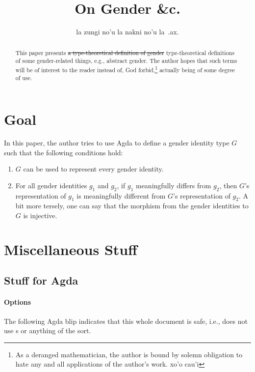 \documentclass{article}
\title{On Gender \&c.}
\author{la zungi no'u la nakni no'u la\ .ax.}
\theoremstyle{remark}
\begin{document}
\maketitle{}

\begin{abstract}
\sloppypar{}
This paper presents \st{a type-theoretical definition of gender} type-theoretical definitions of some gender-related things, e.g., abstract gender.  The author hopes that such terms will be of interest to the reader instead of, God forbid,\footnote{As a deranged mathematician, the author is bound by solemn obligation to hate any and all applications of the author's work.  xo'o cau'i} actually being of some degree of use.
\end{abstract}

\section{Goal}
In this paper, the author tries to use Agda to define a gender identity type \(G\) such that the following conditions hold:

\begin{enumerate}
  \item \(G\) can be used to represent every gender identity.
  \item For all gender identities \(g_1\) and \(g_2\), if \(g_1\) meaningfully differs from \(g_2\), then \(G\)'s representation of \(g_1\) is meaningfully different from \(G\)'s representation of \(g_2\).  A bit more tersely, one can say that the morphism from the gender identities to \(G\) is injective.\label{enum:specRuleRepresentationDifference}
\end{enumerate}

\section{Miscellaneous Stuff}

\subsection{Stuff for Agda}

\paragraph{Options}
The following Agda blip indicates that this whole document is safe, i.e., does not use s or anything of the sort.
\end{document}
